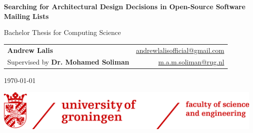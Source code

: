 
\begin{titlepage}
	\headingfont
	\begin{center}
		\LARGE \textbf{Searching for Architectural Design Decisions in Open-Source Software\\Mailing Lists}
		
		\vspace{0.5cm}
		
		\Large
		Bachelor Thesis for Computing Science
		
		\vspace{2cm}
		
		\begin{tabular}{l r}
			\Large \textbf{Andrew Lalis} & \footnotesize\href{mailto:andrewlalisofficial@gmail.com}{andrewlalisofficial@gmail.com} \\
			\footnotesize Supervised by \normalsize\textbf{Dr. Mohamed Soliman} & \footnotesize\href{mailto:m.a.m.soliman@rug.nl}{m.a.m.soliman@rug.nl}
		\end{tabular}
		
		
		\vspace{1cm}
		
		\small
		\normalfont
		\today
		
		\vfill
				
		\includegraphics[width=\textwidth]{img/rug_fse_logo.png}
	\end{center}

	\normalfont
	\normalsize
\end{titlepage}